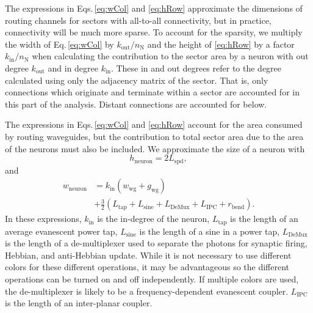 \documentclass[twocolumn]{article}
\begin{document}
The expressions in Eqs.\,\ref{eq:wCol} and \ref{eq:hRow} approximate the dimensions of routing channels for sectors with all-to-all connectivity, but in practice, connectivity will be much more sparse. To account for the sparsity, we multiply the width of Eq.\,\ref{eq:wCol} by $k_{\mathrm{out}}/n_{\mathrm{N}}$ and the height of \ref{eq:hRow} by a factor $k_{\mathrm{in}}/n_{\mathrm{N}}$ when calculating the contribution to the sector area by a neuron with out degree $k_{\mathrm{out}}$ and in degree $k_{\mathrm{in}}$. These in and out degrees refer to the degree calculated using only the adjacency matrix of the sector. That is, only connections which originate and terminate within a sector are accounted for in this part of the analysis. Distant connections are accounted for below.

The expressions in Eqs.\,\ref{eq:wCol} and \ref{eq:hRow} account for the area consumed by routing waveguides, but the contribution to total sector area due to the area of the neurons must also be included. We approximate the size of a neuron with
\begin{equation}
\label{eq:hNeuron}
h_{\mathrm{neuron}} = 2L_{\mathrm{spd}},
\end{equation}
and
\begin{equation}
\label{eq:wNeuron}
\begin{split}
w_{\mathrm{neuron}} &= k_{\mathrm{in}}(w_{\mathrm{wg}}+g_{\mathrm{wg}})\\
&+\frac{3}{2}(L_{\mathrm{tap}}+L_{\mathrm{sine}}+L_{\mathrm{DeMux}}+L_{\mathrm{IPC}}+r_{\mathrm{bend}}).
\end{split}
\end{equation}
In these expressions, $k_{\mathrm{in}}$ is the in-degree of the neuron, $L_{\mathrm{tap}}$ is the length of an average evanescent power tap, $L_{\mathrm{sine}}$ is the length of a sine in a power tap, $L_{\mathrm{DeMux}}$ is the length of a de-multiplexer used to separate the photons for synaptic firing, Hebbian, and anti-Hebbian update. While it is not necessary to use different colors for these different operations, it may be advantageous so the different operations can be turned on and off independently. If multiple colors are used, the de-multiplexer is likely to be a frequency-dependent evanescent coupler. $L_{\mathrm{IPC}}$ is the length of an inter-planar coupler.
\end{document}
